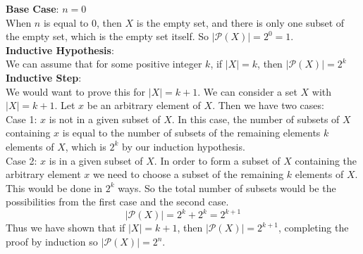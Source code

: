 \documentclass[answers,12pt]{exam}
\newcommand{\bs}{\begin{solution}}
\newcommand{\es}{\end{solution}}
\begin{document}
\begin{enumerate}
\begin{enumerate}
    \end{enumerate} 
    \bs
    \textbf{Base Case}: \(n = 0\)\\
    When \(n\) is equal to \(0\), then \(X\) is the empty set, and there is only one subset of the empty set, which is the empty set itself. So \(|\mathcal{P}(X)| = 2^0 = 1\).\\
    \textbf{Inductive Hypothesis}:\\
    We can assume that for some positive integer \(k\), if \( |X| = k\), then \(|\mathcal{P}(X)| = 2^k\)
    \textbf{Inductive Step}:\\
    We would want to prove this for \(|X| = k+1\). We can consider a set \(X\) with \(|X| = k + 1\). Let \(x\) be an arbitrary element of \(X\). Then we have two cases:\\
    Case 1: \(x\) is not in a given subset of \(X\). In this case, the number of subsets of \(X\) containing \(x\) is equal to the number of subsets of the remaining elements \(k\) elements of \(X\), which is \(2^k\) by our induction hypothesis.\\
    Case 2: \(x\) is in a given subset of \(X\). In order to form a subset of \(X\) containing the arbitrary element \(x\) we need to choose a subset of the remaining \(k\) elements of \(X\). This would be done in \(2^k\) ways. So the total number of subsets would be the possibilities from the first case and the second case.
    \[|\mathcal{P}(X)| = 2^k + 2^k = 2^{k+1}\]
    Thus we have shown that if \(|X| = k+1\), then \(|\mathcal{P}(X)| = 2^{k+1}\), completing the proof by induction so \(|\mathcal{P}(X)| = 2^n\).
    \es
\end{enumerate}
\end{document}
